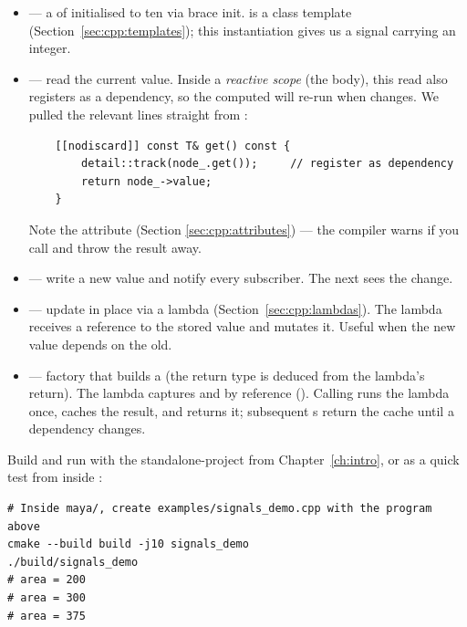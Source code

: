 \begin{itemize}[leftmargin=*]
  \item {} --- a  of
     initialised to ten via brace init. 
    is a class template (Section~\ref{sec:cpp:templates}); this
    instantiation gives us a signal carrying an integer.
  \item {} --- read the current value. Inside a
    \emph{reactive scope} (the  body),
    this read also registers  as a dependency, so the
    computed will re-run when  changes. We pulled the
    relevant lines straight from :

  \begin{lstlisting}
    [[nodiscard]] const T& get() const {
        detail::track(node_.get());     // register as dependency
        return node_->value;
    }
  \end{lstlisting}

    Note the \code{[[nodiscard]]} attribute (Section
    \ref{sec:cpp:attributes}) --- the compiler warns if you call
     and throw the result away.
  \item {} --- write a new value and notify
    every subscriber. The next  sees the change.
  \item {} --- update
    in place via a lambda (Section~\ref{sec:cpp:lambdas}). The
    lambda receives a reference to the stored value and mutates it.
    Useful when the new value depends on the old.
  \item {} --- factory that
    builds a  (the return type is deduced from
    the lambda's return). The lambda captures  and
     by reference (\code{[\&]}). Calling
     runs the lambda once, caches the result, and
    returns it; subsequent s return the cache until a
    dependency changes.
\end{itemize}

Build and run with the standalone-project 
from Chapter~\ref{ch:intro}, or as a quick test from inside
:

\begin{lstlisting}[style=shell]
# Inside maya/, create examples/signals_demo.cpp with the program above
cmake --build build -j10 signals_demo
./build/signals_demo
# area = 200
# area = 300
# area = 375
\end{lstlisting}

